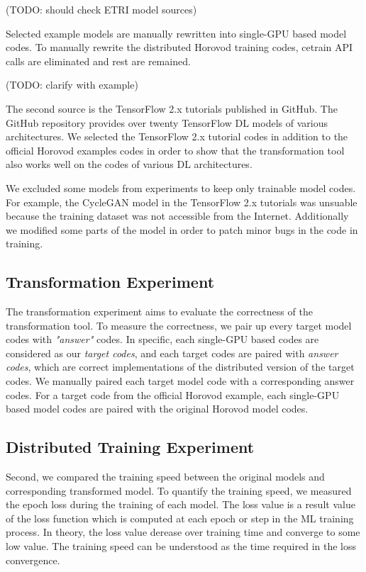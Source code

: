 (TODO: should check ETRI model sources)

Selected example models are manually rewritten into
single-GPU based model codes. To manually rewrite the distributed Horovod
training codes, cetrain API calls are eliminated and rest are remained.   

(TODO: clarify with example)

The second source is the TensorFlow 2.x tutorials published in
GitHub\cite{tf2tutogithub}. The GitHub repository provides over twenty
TensorFlow DL models of various architectures. 
We selected the TensorFlow 2.x tutorial codes in addition to the official
Horovod examples codes in order to show that the transformation tool
also works well on the codes of various DL architectures.

We excluded some models from experiments to keep only trainable model codes. 
For example, the CycleGAN model in the TensorFlow 2.x tutorials
was unsuable because the training dataset was not accessible from the
Internet. Additionally we modified some parts of the model in order to patch
minor bugs in the code in training.

\subsection{Transformation Experiment}

The transformation experiment aims to evaluate the correctness of the
transformation tool. To measure the correctness, we pair up every
target model codes with \textit{"answer"} codes. In specific,      
each single-GPU based codes are considered as our \textit{target codes},
and each target codes are paired with \textit{answer codes}, which are
correct implementations of the distributed version of the target codes. 
We manually paired each target model code with a corresponding answer codes.
For a target code from the official Horovod example, each single-GPU based
model codes are paired with the original Horovod model codes.     


\subsection{Distributed Training Experiment}

Second, we compared the training speed between the original models and
corresponding transformed model. 
To quantify the training speed, we measured the epoch loss during the training
of each model.
The loss value is a result value of the loss function which is computed
at each epoch or step in the ML training process.
In theory, the loss value derease over training time and converge
to some low value.
The training speed can be understood as the time required in the
loss convergence.

